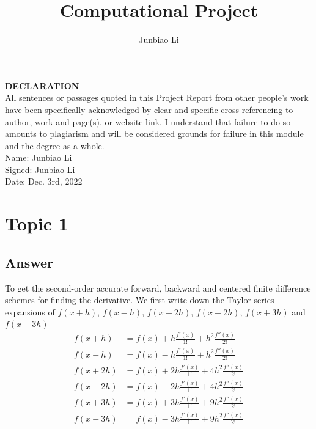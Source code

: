 \documentclass[
	12pt, %
]{fphw}
\title{Computational Project} %
\author{Junbiao Li} %
\institute{University of Leicester} %
\numberwithin{equation}{section}
\numberwithin{figure}{section}
\numberwithin{table}{section}
\begin{document}
\maketitle %

\begin{problem}
\textbf{DECLARATION} \\
All sentences or passages quoted in this Project Report from other people's work have been specifically acknowledged by clear and specific cross referencing to author, work and page(s), or website link. I understand that failure to do so amounts to plagiarism and will be considered grounds for failure in this module and the degree as a whole.\\
Name: Junbiao Li\\
Signed: Junbiao Li\\
Date: Dec. 3rd, 2022
\end{problem}

\section{Topic 1}



\subsection*{Answer}

To get the second-order accurate forward, backward and centered finite difference
schemes for finding the derivative.\cite{numdiff}\cite{nume} We first write down the Taylor series expansions of $f(x+h)$, $f(x-h)$, $f(x+2h)$,  $f(x-2h)$, $f(x+3h)$ and $f(x-3h)$
\begin{equation} \label{eq1}
	\begin{aligned}
		f(x+h)  & =f(x)+h\frac{f'(x)}{1 !}+h^2 \frac{f''(x)}{2 !}   \\
		f(x-h)  & =f(x)-h\frac{f'(x)}{1 !}+h^2 \frac{f''(x)}{2 !}   \\
		f(x+2h) & =f(x)+2h\frac{f'(x)}{1 !}+4h^2 \frac{f''(x)}{2 !} \\
		f(x-2h) & =f(x)-2h\frac{f'(x)}{1 !}+4h^2 \frac{f''(x)}{2 !} \\
		f(x+3h) & =f(x)+3h\frac{f'(x)}{1 !}+9h^2 \frac{f''(x)}{2 !} \\
		f(x-3h) & =f(x)-3h\frac{f'(x)}{1 !}+9h^2 \frac{f''(x)}{2 !} \\
	\end{aligned}
\end{equation}
\end{document}

